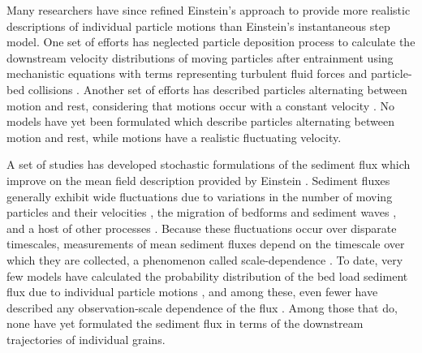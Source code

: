 Many researchers have since refined Einstein's approach to provide more realistic descriptions of individual particle motions than Einstein's instantaneous step model.
One set of efforts has neglected particle deposition process to calculate the downstream velocity distributions of moving particles after entrainment using mechanistic equations with terms representing turbulent fluid forces and particle-bed collisions \citep{Ancey2014,Fan2014}. 
Another set of efforts has described particles alternating between motion and rest, considering that motions occur with a constant velocity \citep{Lisle1998,Lajeunesse2017,Pierce2020b}. 
No models have yet been formulated which describe particles alternating between motion and rest, while motions have a realistic fluctuating velocity.

A set of studies has developed stochastic formulations of the sediment flux which improve on the mean field description provided by Einstein \citep{Furbish2012}. 
Sediment fluxes generally exhibit wide fluctuations due to variations in the number of moving particles and their velocities \citep{Ancey2008,Ancey2014}, the migration of bedforms and sediment waves \citep{Hamamori1962,Guala2014,Hoey1992,Recking2012}, and a host of other processes \citep{Dhont2018}.
Because these fluctuations occur over disparate timescales, measurements of mean sediment fluxes depend on the timescale over which they are collected, a phenomenon called scale-dependence \citep{Saletti2015,Dhont2018,Singh2009,Turowski2010,Ancey2020}.
To date, very few models have calculated the probability distribution of the bed load sediment flux due to individual particle motions \citep{Ancey2008,Ancey2014}, and among these, even fewer have described any observation-scale dependence of the flux \citep{Ancey2020,Turowski2010}. Among those that do, none have yet formulated the sediment flux in terms of the downstream trajectories of individual grains.

